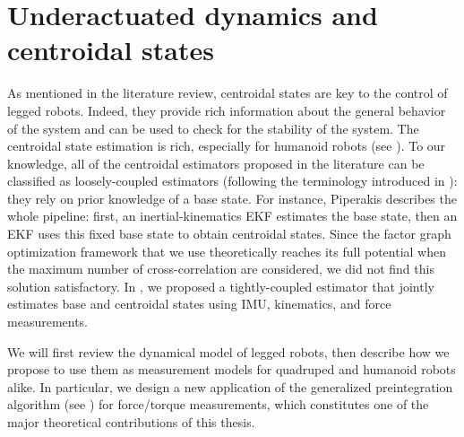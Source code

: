 \chapter{Underactuated dynamics and centroidal states}
\label{chp:underactuade_dynamics}
\minitoc
\bigskip


As mentioned in the literature review, centroidal states are key to the control of legged robots. Indeed, they provide rich information about the general
behavior of the system and can be used to check for the stability of the system. The centroidal state estimation is rich, especially for humanoid
robots (see ). To our knowledge, all of the centroidal estimators proposed in the literature can be classified as loosely-coupled estimators 
(following the terminology introduced in ): they rely on prior knowledge of a base state. For instance, Piperakis \cite{piperakis2018nonlinear} describes the
whole pipeline: first, an inertial-kinematics EKF estimates the base state, then an EKF uses this fixed base state to obtain centroidal states. 
Since the factor graph optimization framework that we use theoretically reaches its full potential when the maximum number of cross-correlation
are considered, we did not find this solution satisfactory. In \cite{fourmy2021contact}, we proposed a tightly-coupled estimator that jointly estimates
base and centroidal states using IMU, kinematics, and force measurements.

We will first review the dynamical model of legged robots, then describe how we propose to use them as measurement models for quadruped and humanoid robots alike.
In particular, we design a new application of the generalized preintegration algorithm (see ) for force/torque measurements, which constitutes
one of the major theoretical contributions of this thesis.


